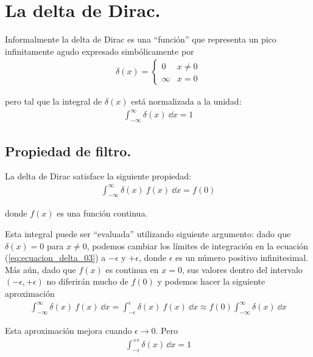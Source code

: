 \section{La delta de Dirac.}

Informalmente la delta de Dirac es una \enquote{función} que representa un pico infinitamente agudo expresado simbólicamente por
\begin{align}
\delta (x) = \begin{cases}
0 & x \neq 0 \\
\infty & x = 0
\end{cases}
\label{eq:ecuacion_delta_01}
\end{align}

pero tal que la integral de $\delta (x)$ está normalizada a la unidad:
\begin{align}
\int_{-\infty}^{\infty} \delta (x) \: \dd{x} = 1 
\label{eq:ecuacion_delta_02}
\end{align}

\subsection{Propiedad de filtro.}

La delta de Dirac satisface la siguiente propiedad:
\begin{align}
\int_{-\infty}^{\infty} \delta (x) \: f(x) \: \dd{x} = f(0)
\label{eq:ecuacion_delta_03}
\end{align}

donde $f(x)$ es una función continua.
\par
Esta integral puede ser \enquote{evaluada} utilizando siguiente argumento: dado que $\delta (x) = 0$
para $x \neq 0$, podemos cambiar los límites de integración en la ecuación (\ref{eq:ecuacion_delta_03}) a $- \epsilon$ y $+ \epsilon$, donde $\epsilon$ es un número positivo infinitesimal. Más aún, dado que $f(x)$ es continua en $x = 0$, sus valores dentro del intervalo $( - \epsilon, + \epsilon)$ no diferirán mucho de $f(0)$ y podemos hacer la siguiente aproximación
\begin{align*}
\int_{-\infty}^{\infty} \delta (x) \: f(x) \: \dd{x} = \int_{-\epsilon}^{\epsilon} \delta (x) \: f(x) \: \dd{x} \approx f(0) \int_{-\infty}^{\infty} \delta (x) \: \dd{x}
\end{align*}

Esta aproximación mejora cuando $\epsilon \to 0$. Pero
\begin{align*}
\int_{-\epsilon}^{+\epsilon} \delta (x) \, \dd{x} = 1
\end{align*}

